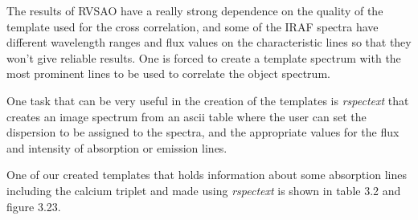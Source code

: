 The results of RVSAO have a really strong dependence on the quality of the template used for the cross correlation, and some of the IRAF spectra have different wavelength ranges and flux values on the characteristic lines so that they won't give reliable results. One is forced to create a template spectrum with the most prominent lines to be used to correlate the object spectrum. 

One task that can be very useful in the creation of the templates is \textit{rspectext} that creates an image spectrum from an ascii table where the user can set the dispersion to be assigned to the spectra, and the appropriate values for the flux and intensity of absorption or emission lines.

One of our created templates that holds information about some absorption lines including the calcium triplet and made using \textit{rspectext} is shown in table 3.2 and figure 3.23.

